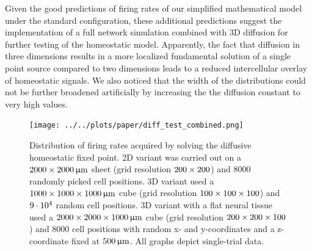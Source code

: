 \documentclass[10pt,letterpaper]{article}
\begin{document}
Given the good predictions of firing rates of our simplified mathematical model under the standard configuration, these additional predictions suggest the implementation of a full network simulation combined with 3D diffusion for further testing of the homeostatic model. Apparently, the fact that diffusion in three dimensions results in a more localized fundamental solution of a single point source compared to two dimensions leads to a reduced intercellular overlay of homeostatic signals. We also noticed that the width of the distributions could not be further broadened artificially by increasing the the diffusion constant to very high values.
\begin{figure}
\texttt{[image: ../../plots/paper/diff\_test\_combined.png]}
\caption{Distribution of firing rates acquired by solving the diffusive homeostatic fixed point. 2D variant was carried out on a $\rm 2000 \times 2000\, \upmu m$ sheet (grid resolution $\rm 200 \times 200$) and $8000$ randomly picked cell positions. 3D variant used a $\rm 1000 \times 1000 \times 1000\, \upmu m$ cube (grid resolution $\rm 100 \times 100 \times 100$) and $\rm 9\cdot 10^4$ random cell positions. 3D variant with a flat neural tissue used a $\rm 2000 \times 2000 \times 1000\, \upmu m$ cube (grid resolution $\rm 200 \times 200 \times 100$) and $8000$ cell positions with random x- and y-coordinates and a z-coordinate fixed at $\rm 500\, \upmu m$. All graphs depict single-trial data.}
\label{Large_Diff_Test}
\end{figure}
\end{document}
